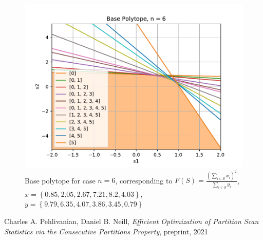\documentclass{article}
\theoremstyle{case}
\begin{document}
\begin{figure}
\centering
  \includegraphics[scale=.75]{base_polytope.pdf}
  \caption{Base polytope for case $n=6$, corresponding to $F(S) = \frac{(\sum_{i \in S}x_i)^2}{\sum_{i \in S}y_i}$, $x = \left\lbrace0.85, 2.05, 2.67, 7.21, 8.2 , 4.03\right\rbrace$, $y = \left\lbrace9.79, 6.35, 4.07, 3.86, 3.45, 0.79\right\rbrace$ }
\end{figure}

\begin{thebibliography}{1}
	 Charles A. Pehlivanian, Daniel B. Neill, {\em Efficient Optimization of Partition Scan Statistics via the Consecutive Partitions Property}, preprint, 2021 
	
\end{thebibliography}
\end{document}
